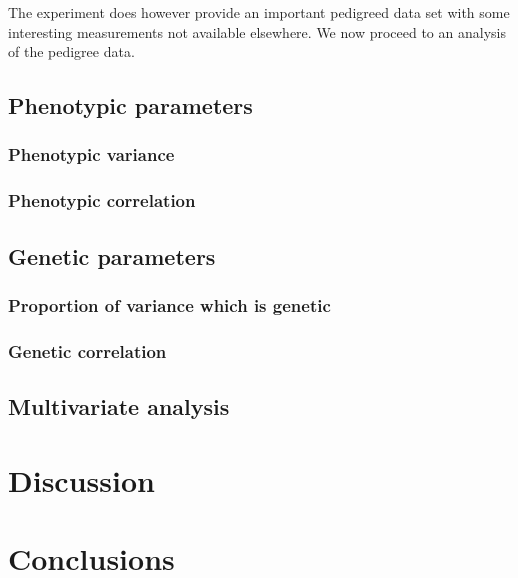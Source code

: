 \documentclass[titlepage]{article}  %
\begin{document}
The experiment does however provide an important pedigreed data set with some interesting measurements not available elsewhere. We now proceed to an analysis of the pedigree data.

\subsection{Phenotypic parameters}
\subsubsection{Phenotypic variance}
\subsubsection{Phenotypic correlation}

\subsection{Genetic parameters}
\subsubsection{Proportion of variance which is genetic}
\subsubsection{Genetic correlation}

\subsection{Multivariate analysis}


\section{Discussion}

\section{Conclusions}
\end{document}
